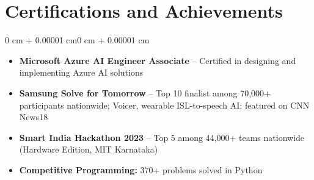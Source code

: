 \documentclass[10pt, letterpaper]{article}
\newenvironment{highlightsforbulletentries}{
    \begin{itemize}[
        topsep=0.10 cm,
        parsep=0.10 cm,
        partopsep=0pt,
        itemsep=0pt,
        leftmargin=10pt
    ]
}{
    \end{itemize}
}
\newenvironment{onecolentry}{
    \begin{adjustwidth}{0 cm + 0.00001 cm}{0 cm + 0.00001 cm}
}{
    \end{adjustwidth}
}
\begin{document}
    \section{Certifications and Achievements}

    \begin{onecolentry}
        \begin{highlightsforbulletentries}
            \item \textbf{Microsoft Azure AI Engineer Associate} -- Certified in designing and implementing Azure AI solutions
            \item \textbf{Samsung Solve for Tomorrow} -- Top 10 finalist among 70,000+ participants nationwide; Voicer, wearable ISL-to-speech AI; featured on CNN News18
            \item \textbf{Smart India Hackathon 2023} -- Top 5 among 44,000+ teams nationwide (Hardware Edition, MIT Karnataka)
            \item \textbf{Competitive Programming:} 370+ problems solved in Python
        \end{highlightsforbulletentries}
    \end{onecolentry}
\end{document}
